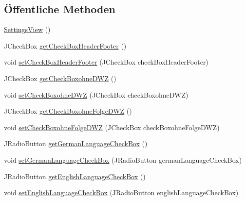 \subsection*{Öffentliche Methoden}
\begin{DoxyCompactItemize}
\item 
\hyperlink{classde_1_1turnierverwaltung_1_1view_1_1_settings_view_a80b03c0b3470e87a1121a0470d8277d4}{Settings\+View} ()
\item 
J\+Check\+Box \hyperlink{classde_1_1turnierverwaltung_1_1view_1_1_settings_view_a5550abd95061fce236313493f77eb6dc}{get\+Check\+Box\+Header\+Footer} ()
\item 
void \hyperlink{classde_1_1turnierverwaltung_1_1view_1_1_settings_view_a797d91e7098841313d09fd75f35d2dc2}{set\+Check\+Box\+Header\+Footer} (J\+Check\+Box check\+Box\+Header\+Footer)
\item 
J\+Check\+Box \hyperlink{classde_1_1turnierverwaltung_1_1view_1_1_settings_view_a1e7dbdcc07c9f643145e0e9d102866f2}{get\+Check\+Boxohne\+D\+WZ} ()
\item 
void \hyperlink{classde_1_1turnierverwaltung_1_1view_1_1_settings_view_a1f59d803fa8c41c77c49cffe3a462e64}{set\+Check\+Boxohne\+D\+WZ} (J\+Check\+Box check\+Boxohne\+D\+WZ)
\item 
J\+Check\+Box \hyperlink{classde_1_1turnierverwaltung_1_1view_1_1_settings_view_adbf2a9a520633f7517771c46116b9386}{get\+Check\+Boxohne\+Folge\+D\+WZ} ()
\item 
void \hyperlink{classde_1_1turnierverwaltung_1_1view_1_1_settings_view_a16c50f505ad513076470dc0ce3f7ca47}{set\+Check\+Boxohne\+Folge\+D\+WZ} (J\+Check\+Box check\+Boxohne\+Folge\+D\+WZ)
\item 
J\+Radio\+Button \hyperlink{classde_1_1turnierverwaltung_1_1view_1_1_settings_view_a0f94ec1fc8009b01da3e0c1eb99dd6b0}{get\+German\+Language\+Check\+Box} ()
\item 
void \hyperlink{classde_1_1turnierverwaltung_1_1view_1_1_settings_view_aa40e9839b102d242bc2c2427a6aa8ca5}{set\+German\+Language\+Check\+Box} (J\+Radio\+Button german\+Language\+Check\+Box)
\item 
J\+Radio\+Button \hyperlink{classde_1_1turnierverwaltung_1_1view_1_1_settings_view_a1031c1042fa4816eb785f5682a02b848}{get\+English\+Language\+Check\+Box} ()
\item 
void \hyperlink{classde_1_1turnierverwaltung_1_1view_1_1_settings_view_acf2a93f362e68a7ba86bf7394997e26b}{set\+English\+Language\+Check\+Box} (J\+Radio\+Button english\+Language\+Check\+Box)
\item 

\end{DoxyCompactItemize}
